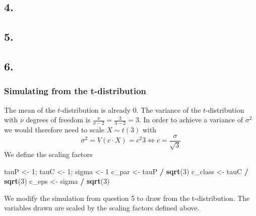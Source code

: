 \documentclass[
]{article}
\newenvironment{Shaded}{\begin{snugshade}}{\end{snugshade}}
\newcommand{\DecValTok}[1]{\textcolor[rgb]{0.00,0.00,0.81}{#1}}
\newcommand{\FunctionTok}[1]{\textcolor[rgb]{0.13,0.29,0.53}{\textbf{#1}}}
\newcommand{\NormalTok}[1]{#1}
\newcommand{\OtherTok}[1]{\textcolor[rgb]{0.56,0.35,0.01}{#1}}
\newcommand{\SpecialCharTok}[1]{\textcolor[rgb]{0.81,0.36,0.00}{\textbf{#1}}}
\begin{document}
\subsection{4.}\label{section-4}

\subsection{5.}\label{section-5}

\subsection{6.}\label{section-6}

\subsubsection{Simulating from the
t-distribution}\label{simulating-from-the-t-distribution}

The mean of the \(t\)-distribution is already \(0\). The variance of the
\(t\)-distribution with \(\nu\) degrees of freedom is
\(\frac{\nu}{\nu-2} = \frac{3}{3-2} = 3\). In order to achieve a
variance of \(\sigma^2\) we would therefore need to scale
\(X \sim t(3)\) with
\[\sigma^2= V(c \cdot X) = c^2 3 \Leftrightarrow c = {\frac{\sigma}{\sqrt3}}\]
We define the scaling factors

\begin{Shaded}
\begin{Highlighting}[]
\NormalTok{tauP }\OtherTok{\textless{}{-}} \DecValTok{1}\NormalTok{; tauC }\OtherTok{\textless{}{-}} \DecValTok{1}\NormalTok{; sigma }\OtherTok{\textless{}{-}} \DecValTok{1}
\NormalTok{c\_par }\OtherTok{\textless{}{-}}\NormalTok{ tauP }\SpecialCharTok{/} \FunctionTok{sqrt}\NormalTok{(}\DecValTok{3}\NormalTok{)}
\NormalTok{c\_class }\OtherTok{\textless{}{-}}\NormalTok{ tauC }\SpecialCharTok{/} \FunctionTok{sqrt}\NormalTok{(}\DecValTok{3}\NormalTok{)}
\NormalTok{c\_eps }\OtherTok{\textless{}{-}}\NormalTok{ sigma }\SpecialCharTok{/} \FunctionTok{sqrt}\NormalTok{(}\DecValTok{3}\NormalTok{)}
\end{Highlighting}
\end{Shaded}

We modify the simulation from question 5 to draw from the
t-distribution. The variables drawn are scaled by the scaling factors
defined above.
\end{document}
